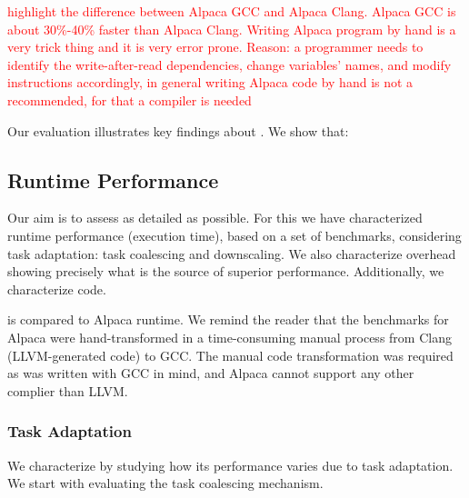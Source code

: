 \textcolor{red}{highlight the difference between Alpaca GCC and Alpaca Clang. Alpaca GCC is about 30\%-40\% faster than Alpaca Clang. Writing Alpaca program by hand is a very trick thing and it is very error prone. Reason: a programmer needs to identify the write-after-read dependencies, change variables' names, and modify instructions accordingly, in general writing Alpaca code by hand is not a recommended, for that a compiler is needed}

Our evaluation illustrates key findings about \sys. We show that: 


\subsection{\sys Runtime Performance}
\label{sec:results_evaluation}

Our aim is to assess \sys as detailed as possible. For this we have characterized \sys runtime performance (execution time), based on a set of benchmarks, considering task adaptation: task coalescing and downscaling. We also characterize \sys overhead showing precisely what is the source of \sys superior performance. Additionally, we characterize \sys code. 

\sys is compared to Alpaca runtime. We remind the reader that the benchmarks for Alpaca were hand-transformed in a time-consuming manual process from Clang (LLVM-generated code) to GCC. The manual code transformation was required as \sys was written with GCC in mind, and Alpaca cannot support any other complier than LLVM.

\subsubsection{\sys Task Adaptation}
\label{sec:result_coalescing}

We characterize \sys by studying how its performance varies due to task adaptation. We start with evaluating the task coalescing mechanism.


